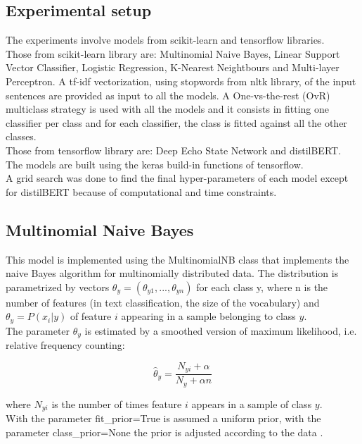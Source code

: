 \documentclass[10.5pt]{article}
\begin{document}
\begin{multicols*}{2}
\section{Experimental setup}
The experiments involve models from scikit-learn and tensorflow libraries.\\
Those from scikit-learn library are: Multinomial Naive Bayes, Linear Support Vector Classifier, Logistic Regression, K-Nearest Neightbours and Multi-layer Perceptron. A tf-idf vectorization, using stopwords from nltk library, of the input sentences are provided as input to all the models. A One-vs-the-rest (OvR) multiclass strategy is used with all the models and it consists in fitting one classifier per class and for each classifier, the class is fitted against all the other classes.\\
Those from tensorflow library are: Deep Echo State Network and distilBERT. The models are built using the keras build-in functions of tensorflow.\\
A grid search was done to find the final hyper-parameters of each model except for distilBERT because of computational and time constraints.

\subsection{Multinomial Naive Bayes}

This model is implemented using the MultinomialNB class that implements the naive Bayes algorithm for multinomially distributed data. The distribution is parametrized by vectors $\theta_{y}=(\theta_{y1},...,\theta_{yn})$ for each class y, where n is the number of features (in text classification, the size of the vocabulary) and $\theta_{y}=P(x_{i}|y)$ of feature $i$ appearing in a sample belonging to class $y$.\\
The parameter $\theta_{y}$ is estimated by a smoothed version of maximum likelihood, i.e. relative frequency counting:

\begin{equation}
\hat\theta_{y}=\frac{N_{yi}+\alpha}{N_{y}+\alpha n}
\end{equation}

where $N_{yi}$ is the number of times feature $i$ appears in a sample of class $y$.\\
With the parameter fit\_prior=True is assumed a uniform prior, with the parameter class\_prior=None the prior is adjusted according to the data \cite{mnb}.


\end{multicols*}
\end{document}
